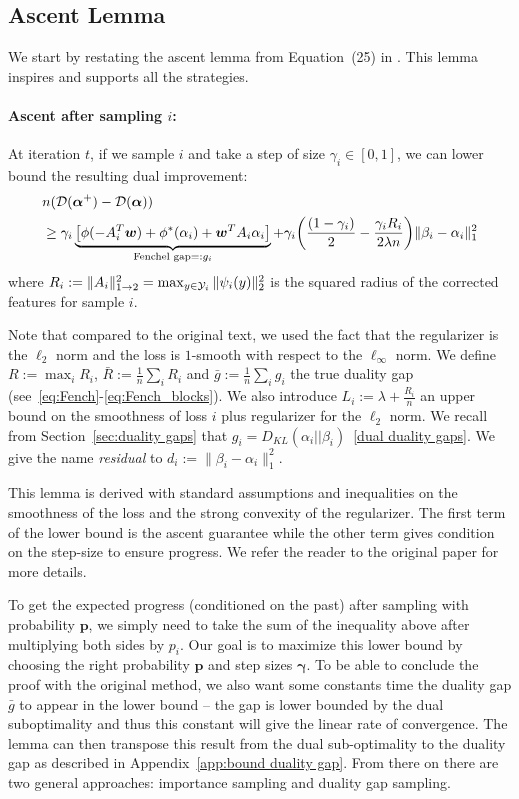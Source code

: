 \subsection{Ascent Lemma}\label{ascent lemma}
We start by restating the ascent lemma from Equation~(25) in \citet{shalev-shwartz_accelerated_2013-1}.
This lemma inspires and supports all the strategies.

\paragraph{Ascent after sampling $i$:}
At iteration $t$, if we sample $i$ and take a step of size  $\gamma_i \in [0,1]$, we can lower bound the resulting dual improvement:
\begin{align}
	\label{one point descent}
    & n ({\mathcal D}(\boldsymbol{\alpha}^+) - {\mathcal D}(\boldsymbol{\alpha})) \notag \\
    & \geq \gamma_i \underbrace{ \big [ \phi(-A_i^T \boldsymbol{w}) + \phi^*(\alpha_i) + \boldsymbol{w}^T A_i \alpha_i \big ] }
    _{ \textrm{Fenchel gap} =: g_i} 
    + \gamma_i \bigg ( \frac{(1-\gamma_i)}{2} - \frac{\gamma_i R_i}{2 \lambda n} \bigg )\| \beta_i - \alpha_i \|^2_1
\end{align}
where  $R_i := \|A_i\|^2_{1\rightarrow 2}  = \max_{y\in{\mathcal Y}_i} \| \psi_i(y) \|_2^2 $ is the squared radius of the corrected features for sample $i$.

Note that compared to the original text, we used the fact that the regularizer is the $\ell_2$ norm and the loss is $1$-smooth with respect to the $\ell_\infty$ norm.
We define $R:=\max_i R_i$, ${\bar R := \frac{1}{n} \sum_i R_i}$ and $\bar g := \frac{1}{n} \sum_i g_i$ the true duality gap (see~\eqref{eq:Fench}-\eqref{eq:Fench_blocks}).
We also introduce $L_i := \lambda + \frac{R_i}{n}$ an upper bound on the smoothness of loss $i$ plus regularizer for the $\ell_2$ norm.
We recall from Section~\ref{sec:duality gaps} that $g_i = D_{KL}(\alpha_i || \beta_i)$~\eqref{dual duality gaps}.
We give the name \textit{residual} to $d_i := \| \beta_i - \alpha_i \|^2_1$.

This lemma is derived with standard assumptions and inequalities on the smoothness of the loss and the strong convexity of the regularizer.
The first term of the lower bound is the ascent guarantee while the other term gives condition on the step-size to ensure progress.
We refer the reader to the original paper for more details.

To get the expected progress (conditioned on the past) after sampling with probability $\bm p$, we simply need to take the sum of the inequality above after multiplying both sides by $p_i$.
Our goal is to maximize this lower bound by choosing the right probability $\bm p$ and step sizes $\bm \gamma$.
To be able to conclude the proof with the original method, we also want some constants time the duality gap $\bar g$ to appear in the lower bound -- the gap is lower bounded by the dual suboptimality and thus this constant will give the linear rate of convergence.
The lemma can then transpose this result from the dual sub-optimality to the duality gap as described in Appendix~\ref{app:bound duality gap}.
From there on there are two general approaches: importance sampling and duality gap sampling.

